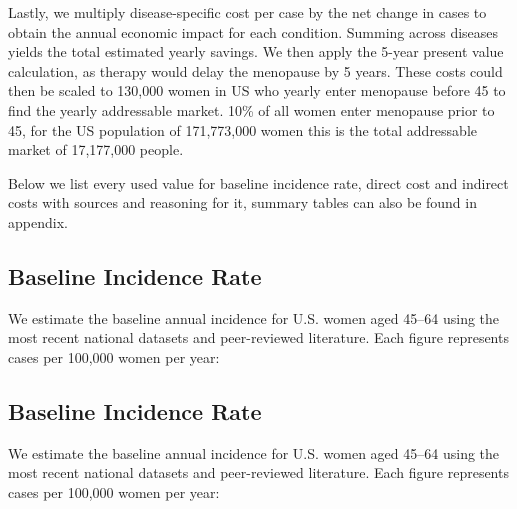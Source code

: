 \documentclass[12pt]{article}
\begin{document}
Lastly, we multiply disease-specific cost per case by the net change in cases to obtain the annual economic impact for each condition. Summing across diseases yields the total estimated yearly savings. We then apply the 5-year present value calculation, as therapy would delay the menopause by 5 years. These costs could then be scaled to 130,000 women in US who yearly enter menopause before 45 to find the yearly addressable market. 10\% of all women enter menopause prior to 45, for the US population of 171,773,000 women this is the total addressable market of 17,177,000 people. 

Below we list every used value for baseline incidence rate, direct cost and indirect costs with sources and reasoning for it, summary tables can also be found in appendix.

\subsection{Baseline Incidence Rate}

We estimate the baseline annual incidence for U.S. women aged 45--64 using the most recent national datasets and peer-reviewed literature. Each figure represents cases per 100,000 women per year:

\subsection{Baseline Incidence Rate}

We estimate the baseline annual incidence for U.S. women aged 45--64 using the most recent national datasets and peer-reviewed literature. Each figure represents cases per 100,000 women per year:
\end{document}
